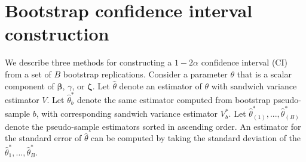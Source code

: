 \documentclass[
  man, donotrepeattitle,floatsintext]{apa7}
\begin{document}
\section{Bootstrap confidence interval construction}\label{bootstrap-CIs}

We describe three methods for constructing a \(1 - 2\alpha\) confidence interval (CI) from a set of \(B\) bootstrap replications.
Consider a parameter \(\theta\) that is a scalar component of \(\boldsymbol\beta\), \(\gamma\), or \(\boldsymbol\zeta\).
Let \(\hat\theta\) denote an estimator of \(\theta\) with sandwich variance estimator \(V\).
Let \(\hat\theta^*_{b}\) denote the same estimator computed from bootstrap pseudo-sample \(b\), with corresponding sandwich variance estimator \(V^*_{b}\).
Let \(\hat\theta^*_{(1)},...,\hat\theta^*_{(B)}\) denote the pseudo-sample estimators sorted in ascending order.
An estimator for the standard error of \(\hat\theta\) can be computed by taking the standard deviation of the \(\hat\theta^*_1,...,\hat\theta^*_{B}\).
\end{document}
